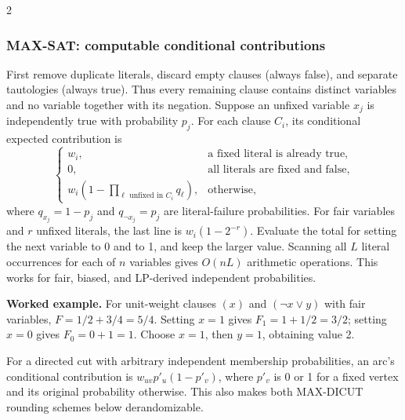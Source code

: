 \documentclass[8pt]{extarticle}
\theoremstyle{definition}
\begin{document}
\begin{multicols*}{2}
\subsubsection*{MAX-SAT: computable conditional contributions}
First remove duplicate literals, discard empty clauses (always false), and
separate tautologies (always true). Thus every remaining clause contains
distinct variables and no variable together with its negation. Suppose an
unfixed variable $x_j$ is independently true with probability $p_j$.
For each clause $C_i$, its conditional expected contribution is
\[
  \begin{cases}
    w_i, &\text{a fixed literal is already true},\\
    0, &\text{all literals are fixed and false},\\
    w_i\left(1-\displaystyle\prod_{\ell\text{ unfixed in }C_i}
       q_\ell\right), &\text{otherwise},
  \end{cases}
\]
where $q_{x_j}=1-p_j$ and $q_{\neg x_j}=p_j$ are literal-failure
probabilities. For fair variables and $r$ unfixed literals, the last line is
$w_i(1-2^{-r})$. Evaluate the total for setting the next variable to 0 and
to 1, and keep the larger value. Scanning all $L$ literal occurrences for
each of $n$ variables gives $O(nL)$ arithmetic operations. This works for
fair, biased, and LP-derived independent probabilities.

\textbf{Worked example.}
For unit-weight clauses $(x)$ and $(\neg x\lor y)$ with fair variables,
$F=1/2+3/4=5/4$. Setting $x=1$ gives $F_1=1+1/2=3/2$; setting $x=0$
gives $F_0=0+1=1$. Choose $x=1$, then $y=1$, obtaining value 2.

For a directed cut with arbitrary independent membership probabilities,
an arc's conditional contribution is $w_{uv}p'_u(1-p'_v)$, where $p'_v$ is
0 or 1 for a fixed vertex and its original probability otherwise.
This also makes both MAX-DICUT rounding schemes below derandomizable.


\end{multicols*}
\end{document}
